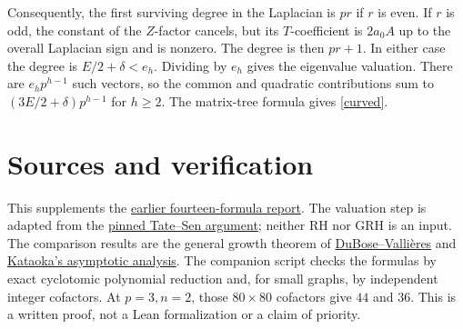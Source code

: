 \documentclass[11pt]{article}
\begin{document}
Consequently, the first surviving degree in the Laplacian is \(pr\)
if \(r\) is even. If \(r\) is odd, the constant of the \(Z\)-factor
cancels, but its \(T\)-coefficient is \(2a_0 A\) up to the
overall Laplacian sign and is nonzero. The degree is then \(pr+1\).
In either case the degree is \(E/2+\delta<e_h\). Dividing by \(e_h\)
gives the eigenvalue valuation. There are \(e_h p^{h-1}\) such vectors,
so the common and quadratic contributions sum to
\((3E/2+\delta)p^{h-1}\) for \(h\ge2\).
The matrix-tree formula gives \eqref{curved}.

\section*{Sources and verification}
This supplements the \href{https://chatgpt.com/c/6b07d086-1ef0-83e8-9354-9bbcf6afcaf3?messageId=88092bdb-6383-595f-a45a-d402786a8c09}{earlier fourteen-formula report}.
The valuation step is adapted from the
\href{https://github.com/lsernau/grh-lean/blob/72fead102f663d5c7a407964a13dc0cf9d977207/grh/src/Lib/PadicHodge/TateSen.lean\#L131-L157}{pinned Tate--Sen argument};
neither RH nor GRH is an input. The comparison results are the
general growth theorem of \href{https://alco.centre-mersenne.org/articles/10.5802/alco.304/}{DuBose--Valli\`eres}
and \href{https://arxiv.org/abs/2606.03579}{Kataoka's asymptotic analysis}.
The companion script checks the formulas by exact cyclotomic polynomial
reduction and, for small graphs, by independent integer cofactors.
At \(p=3,n=2\), those \(80\times80\) cofactors give \(44\) and \(36\).
This is a written proof, not a Lean formalization or a claim of priority.
\end{document}
